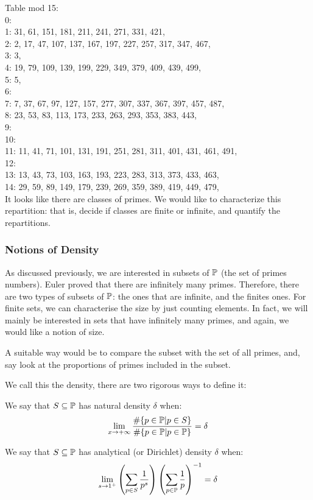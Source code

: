 Table mod 15:\\
0: \\
1: 31, 61, 151, 181, 211, 241, 271, 331, 421, \\
2: 2, 17, 47, 107, 137, 167, 197, 227, 257, 317, 347, 467, \\
3: 3, \\
4: 19, 79, 109, 139, 199, 229, 349, 379, 409, 439, 499, \\
5: 5, \\
6: \\
7: 7, 37, 67, 97, 127, 157, 277, 307, 337, 367, 397, 457, 487, \\
8: 23, 53, 83, 113, 173, 233, 263, 293, 353, 383, 443, \\
9: \\
10: \\
11: 11, 41, 71, 101, 131, 191, 251, 281, 311, 401, 431, 461, 491, \\
12: \\
13: 13, 43, 73, 103, 163, 193, 223, 283, 313, 373, 433, 463, \\
14: 29, 59, 89, 149, 179, 239, 269, 359, 389, 419, 449, 479, \\

It looks like there are classes of primes.
We would like to characterize this repartition: that is, decide if classes are finite or infinite, and quantify the repartitions.



\subsubsection{Notions of Density}
As discussed previously, we are interested in subsets of $\mathbb{P}$ (the set of primes numbers).
Euler proved that there are infinitely many primes.
Therefore, there are two types of subsets of $\mathbb{P}$: the ones that are infinite, and the finites ones.
For finite sets, we can characterise the size by just counting elements.
In fact, we will mainly be interested in sets that have infinitely many primes, and again, we would like a notion of size.

A suitable way would be to compare the subset with the set of all primes, and, say look at the proportions of primes included in the subset.

We call this the density, there are two rigorous ways to define it:
\begin{definition}
	We say that $S \subseteq \mathbb{P}$ has natural density $\delta$ when:
	$$
	\lim_{x \to +\infty}
	\frac{ \# \{ p \in \mathbb{P} | p \in S \}}
	{ \# \{ p \in \mathbb{P} | p \in \mathbb{P} \}} = \delta
	$$
\end{definition}
\begin{definition}
	We say that $S \subseteq \mathbb{P}$ has analytical (or Dirichlet) density $\delta$ when:
	$$
	\lim_{s \to 1^+}
	\left( \sum_{p \in S} \frac{1}{p^s} \right) 
	\left( \sum_{p \in \mathbb{P}} \frac{1}{p} \right)^{-1} = \delta
	$$
\end{definition}

